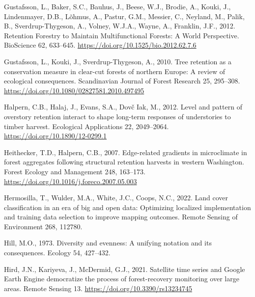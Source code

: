 \documentclass[
  12pt,
]{article}
\newlength{\cslhangindent}
\newlength{\cslentryspacingunit} %
\newenvironment{CSLReferences}[2] %
 {%
  \setlength{\parindent}{0pt}
  \ifodd #1
  \let\oldpar\par
  \def\par{\hangindent=\cslhangindent\oldpar}
  \fi
  \setlength{\parskip}{#2\cslentryspacingunit}
 }%
 {}
\begin{document}
\begin{CSLReferences}{1}{0}
\leavevmode{}%
Gustafsson, L., Baker, S.C., Bauhus, J., Beese, W.J., Brodie, A., Kouki, J., Lindenmayer, D.B., Lõhmus, A., Pastur, G.M., Messier, C., Neyland, M., Palik, B., Sverdrup-Thygeson, A., Volney, W.J.A., Wayne, A., Franklin, J.F., 2012. Retention {Forestry} to {Maintain} {Multifunctional} {Forests}: {A} {World} {Perspective}. BioScience 62, 633--645. \url{https://doi.org/10.1525/bio.2012.62.7.6}

\leavevmode{}%
Gustafsson, L., Kouki, J., Sverdrup-Thygeson, A., 2010. Tree retention as a conservation measure in clear-cut forests of northern {Europe}: {A} review of ecological consequences. Scandinavian Journal of Forest Research 25, 295--308. \url{https://doi.org/10.1080/02827581.2010.497495}

\leavevmode{}%
Halpern, C.B., Halaj, J., Evans, S.A., Dovč Iak, M., 2012. Level and pattern of overstory retention interact to shape long-term responses of understories to timber harvest. Ecological Applications 22, 2049--2064. \url{https://doi.org/10.1890/12-0299.1}

\leavevmode{}%
Heithecker, T.D., Halpern, C.B., 2007. Edge-related gradients in microclimate in forest aggregates following structural retention harvests in western {Washington}. Forest Ecology and Management 248, 163--173. \url{https://doi.org/10.1016/j.foreco.2007.05.003}

\leavevmode{}%
Hermosilla, T., Wulder, M.A., White, J.C., Coops, N.C., 2022. Land cover classification in an era of big and open data: {Optimizing} localized implementation and training data selection to improve mapping outcomes. Remote Sensing of Environment 268, 112780.

\leavevmode{}%
Hill, M.O., 1973. Diversity and evenness: A unifying notation and its consequences. Ecology 54, 427--432.

\leavevmode{}%
Hird, J.N., Kariyeva, J., McDermid, G.J., 2021. Satellite time series and {Google} {Earth} {Engine} democratize the process of forest-recovery monitoring over large areas. Remote Sensing 13. \url{https://doi.org/10.3390/rs13234745}


\end{CSLReferences}
\end{document}
